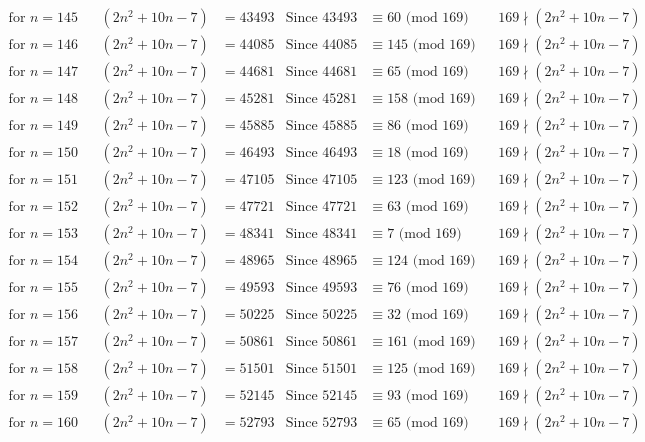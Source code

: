 \documentclass[12pt]{article}
\begin{document}
\begin{align*}
\text{for $n = 145 $}&& (2n^2+10n-7) &= 43493 & \text{Since } 43493  &\equiv  60 \text{ (mod $169$)}&& 169 \nmid (2n^2+10n-7)\\
\text{for $n = 146 $}&& (2n^2+10n-7) &= 44085 & \text{Since } 44085  &\equiv  145 \text{ (mod $169$)}&& 169 \nmid (2n^2+10n-7)\\
\text{for $n = 147 $}&& (2n^2+10n-7) &= 44681 & \text{Since } 44681  &\equiv  65 \text{ (mod $169$)}&& 169 \nmid (2n^2+10n-7)\\
\text{for $n = 148 $}&& (2n^2+10n-7) &= 45281 & \text{Since } 45281  &\equiv  158 \text{ (mod $169$)}&& 169 \nmid (2n^2+10n-7)\\
\text{for $n = 149 $}&& (2n^2+10n-7) &= 45885 & \text{Since } 45885  &\equiv  86 \text{ (mod $169$)}&& 169 \nmid (2n^2+10n-7)\\
\text{for $n = 150 $}&& (2n^2+10n-7) &= 46493 & \text{Since } 46493  &\equiv  18 \text{ (mod $169$)}&& 169 \nmid (2n^2+10n-7)\\
\text{for $n = 151 $}&& (2n^2+10n-7) &= 47105 & \text{Since } 47105  &\equiv  123 \text{ (mod $169$)}&& 169 \nmid (2n^2+10n-7)\\
\text{for $n = 152 $}&& (2n^2+10n-7) &= 47721 & \text{Since } 47721  &\equiv  63 \text{ (mod $169$)}&& 169 \nmid (2n^2+10n-7)\\
\text{for $n = 153 $}&& (2n^2+10n-7) &= 48341 & \text{Since } 48341  &\equiv  7 \text{ (mod $169$)}&& 169 \nmid (2n^2+10n-7)\\
\text{for $n = 154 $}&& (2n^2+10n-7) &= 48965 & \text{Since } 48965  &\equiv  124 \text{ (mod $169$)}&& 169 \nmid (2n^2+10n-7)\\
\text{for $n = 155 $}&& (2n^2+10n-7) &= 49593 & \text{Since } 49593  &\equiv  76 \text{ (mod $169$)}&& 169 \nmid (2n^2+10n-7)\\
\text{for $n = 156 $}&& (2n^2+10n-7) &= 50225 & \text{Since } 50225  &\equiv  32 \text{ (mod $169$)}&& 169 \nmid (2n^2+10n-7)\\
\text{for $n = 157 $}&& (2n^2+10n-7) &= 50861 & \text{Since } 50861  &\equiv  161 \text{ (mod $169$)}&& 169 \nmid (2n^2+10n-7)\\
\text{for $n = 158 $}&& (2n^2+10n-7) &= 51501 & \text{Since } 51501  &\equiv  125 \text{ (mod $169$)}&& 169 \nmid (2n^2+10n-7)\\
\text{for $n = 159 $}&& (2n^2+10n-7) &= 52145 & \text{Since } 52145  &\equiv  93 \text{ (mod $169$)}&& 169 \nmid (2n^2+10n-7)\\
\text{for $n = 160 $}&& (2n^2+10n-7) &= 52793 & \text{Since } 52793  &\equiv  65 \text{ (mod $169$)}&& 169 \nmid (2n^2+10n-7)\\

\end{align*}
\end{document}
